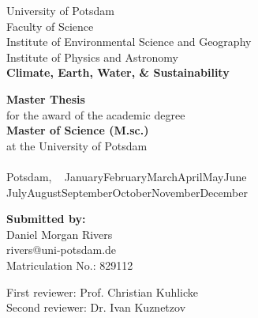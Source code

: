 \documentclass[12pt,a4paper]{article}
\makeatletter
\newcommand{\ThesisTitle}{\TITLE}
\newcommand{\AuthorName}{Daniel Morgan Rivers}
\newcommand{\AuthorAddressOne}{Bandelstraße 25}
\newcommand{\AuthorAddressTwo}{Berlin, Germany 10559}
\newcommand{\AuthorEmail}{rivers@uni-potsdam.de}
\newcommand{\MatricNo}{829112}
\newcommand{\FirstReviewer}{Prof. Christian Kuhlicke}
\newcommand{\SecondReviewer}{Dr. Ivan Kuznetzov}
\newcommand{\MonthName}{%
  \ifcase\month
  \or January\or February\or March\or April\or May\or June%
  \or July\or August\or September\or October\or November\or December%
  \fi
}
\newcommand{\DateDDMonthYYYY}{\number\day~\MonthName~\number\year}
\makeatother
\begin{document}
\begin{center}
    \vspace{1.8cm}

    
    \begin{center}
        \begin{flushleft}
        University of Potsdam\\
        Faculty of Science\\
        Institute of Environmental Science and Geography\\
        Institute of Physics and Astronomy\\
        \textbf{Climate, Earth, Water, \& Sustainability\\[4em]}
        \end{flushleft}
    
        {\large \textbf{Master Thesis}}\\
        for the award of the academic degree\\
        \textbf{Master of Science (M.sc.)}\\
        at the University of Potsdam\\[3em]
    
        \textbf{\LARGE \ThesisTitle}\\ [3em] %
    
        Potsdam, \DateDDMonthYYYY \\[9em]
    
        \begin{flushleft}
            \textbf{Submitted by:}\\[-0.2em]
            \AuthorName\\
            \AuthorEmail\\
            Matriculation No.: \MatricNo

            First reviewer: \FirstReviewer\\
            Second reviewer: \SecondReviewer
        \end{flushleft}

    

\end{center}
\end{center}
\end{document}
